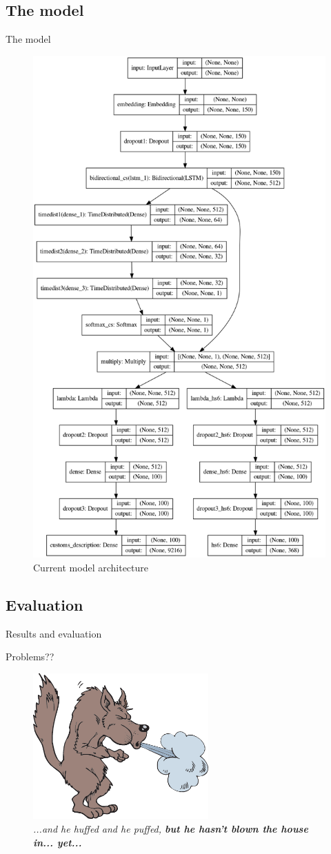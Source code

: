 \documentclass[9pt]{beamer}
\begin{document}
\subsection{The model}
\begin{frame}{The model}
	\begin{figure}
		\includegraphics[height=0.6\textwidth]{imgs/model.png}
		\caption{Current model architecture}
	\end{figure}
\end{frame}


\subsection{Evaluation}
\begin{frame}{Results and evaluation}

\end{frame}

\begin{frame}{Problems??}
	\begin{center}
		\begin{figure}
			\includegraphics[width=0.6\textwidth,height=!]{imgs/huffedandpuffed.png}
			\caption{\textit{...and he huffed and he puffed, \textbf{but he hasn't blown the house in... yet...}}}
		\end{figure}
	\end{center}
\end{frame}
\end{document}
